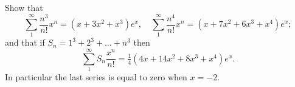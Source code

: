 Show that
\[
\sum_{1}^{\infty} \frac{n^{3}}{n!} x^{n} = (x + 3x^{2} +  x^{3})e^{x},\quad
\sum_{1}^{\infty} \frac{n^{4}}{n!} x^{n} = (x + 7x^{2} + 6x^{3} + x^{4})e^{x};
\]
and that if $S_{n} = 1^{3} + 2^{3} + \dots + n^{3}$ then
\[
\sum_{1}^{\infty} S_{n}\frac{x^{n}}{n!}
  = \tfrac{1}{4}(4x + 14x^{2} + 8x^{3} + x^{4})e^{x}.
\]
In particular the last series is equal to zero when $x = -2$. 

